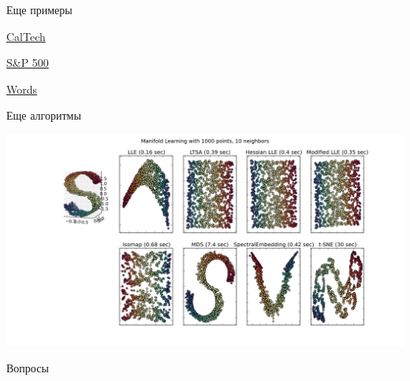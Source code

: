 \documentclass[aspectratio=169]{beamer}
\begin{document}
\begin{frame}{Еще примеры}

\href{http://lvdmaaten.github.io/tsne/examples/caltech101_tsne.jpg}{CalTech}

\vspace{1em}
\href{http://lvdmaaten.github.io/tsne/examples/SP500_tsne.png}{S\&P 500}

\vspace{1em}
\href{http://www.cs.toronto.edu/~hinton/turian.png}{Words}

\end{frame}

\begin{frame}{Еще алгоритмы}

\begin{center}
\includegraphics[scale=0.27]{images/mainfold.png}
\end{center}

\end{frame}

\begin{frame}[plain]
\begin{center}
{\Large Вопросы}
\end{center}
\end{frame}
\end{document}

